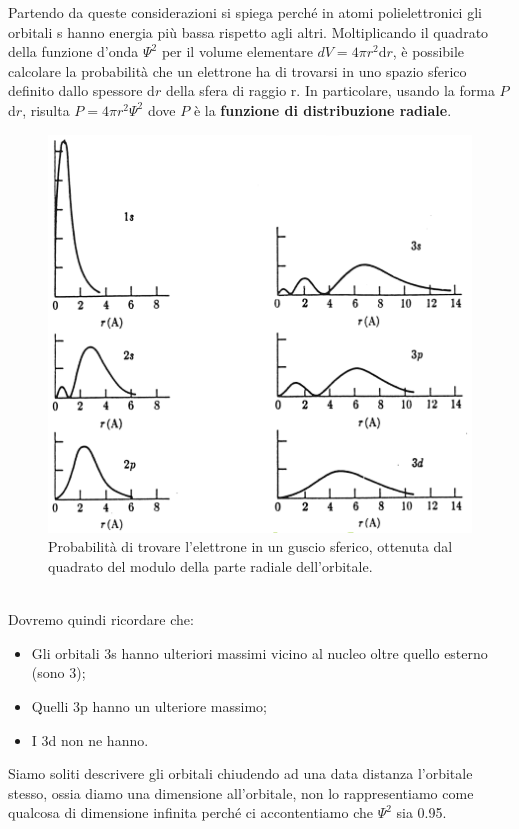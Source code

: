 Partendo da queste considerazioni si spiega perché in atomi polielettronici gli orbitali s hanno energia più bassa rispetto agli altri.
Moltiplicando il quadrato della funzione d'onda $\Psi^2$ per il volume elementare $dV=4\pi r^2\text{d}r$, è possibile calcolare la probabilità che un elettrone ha di trovarsi in uno spazio sferico definito dallo spessore d$r$ della sfera di raggio r. In particolare, usando la forma $P$d$r$, risulta $P=4\pi r^2\Psi^2$ dove $P$ è la \textbf{funzione di distribuzione radiale}.
\begin{figure}[htp]
  \centering
  \includegraphics[width=12cm]{immagini/picchi.png}
  \caption{Probabilità di trovare l'elettrone in un guscio sferico, ottenuta dal
  quadrato del modulo della parte radiale dell'orbitale.}
\end{figure}\\
Dovremo quindi ricordare che:
\begin{itemize}
  \item Gli orbitali 3s hanno ulteriori massimi vicino al nucleo oltre quello esterno (sono 3);
  \item Quelli 3p hanno un ulteriore massimo;
  \item I 3d non ne hanno.
\end{itemize}
Siamo soliti descrivere gli orbitali chiudendo ad una data distanza l'orbitale stesso, ossia diamo una dimensione all'orbitale, non lo rappresentiamo come qualcosa di dimensione infinita perché ci accontentiamo che $\Psi^2$ sia 0.95.
